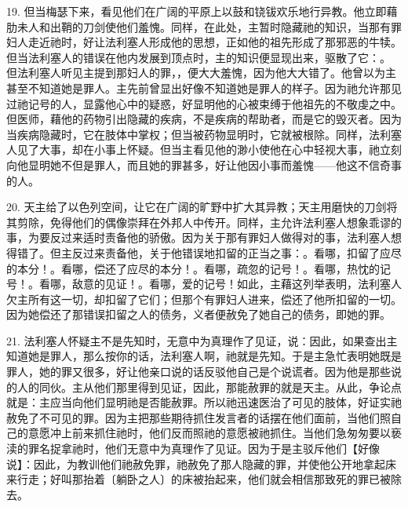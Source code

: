 19. 但当梅瑟下来，看见他们在广阔的平原上以鼓和铙钹欢乐地行异教。他立即藉肋未人和出鞘的刀剑使他们羞愧。同样，在此处，主暂时隐藏祂的知识，当那有罪妇人走近祂时，好让法利塞人形成他的思想，正如他的祖先形成了那邪恶的牛犊。但当法利塞人的错误在他内发展到顶点时，主的知识便显现出来，驱散了它：。 但法利塞人听见主提到那妇人的罪，，便大大羞愧，因为他大大错了。他曾以为主甚至不知道她是罪人。主先前曾显出好像不知道她是罪人的样子。因为祂允许那见过祂记号的人，显露他心中的疑惑，好显明他的心被束缚于他祖先的不敬虔之中。但医师，藉他的药物引出隐藏的疾病，不是疾病的帮助者，而是它的毁灭者。因为当疾病隐藏时，它在肢体中掌权；但当被药物显明时，它就被根除。同样，法利塞人见了大事，却在小事上怀疑。但当主看见他的渺小使他在心中轻视大事，祂立刻向他显明她不但是罪人，而且她的罪甚多，好让他因小事而羞愧——他这不信奇事的人。\par

20. 天主给了以色列空间，让它在广阔的旷野中扩大其异教；天主用磨快的刀剑将其剪除，免得他们的偶像崇拜在外邦人中传开。同样，主允许法利塞人想象乖谬的事，为要反过来适时责备他的骄傲。因为关于那有罪妇人做得对的事，法利塞人想得错了。但主反过来责备他，关于他错误地扣留的正当之事：。看哪，扣留了应尽的本分！。看哪，偿还了应尽的本分！。看哪，疏忽的记号！。看哪，热忱的记号！。看哪，敌意的见证！。看哪，爱的记号！如此，主藉这列举表明，法利塞人欠主所有这一切，却扣留了它们；但那个有罪妇人进来，偿还了他所扣留的一切。因为她偿还了那错误扣留之人的债务，义者便赦免了她自己的债务，即她的罪。\par

21. 法利塞人怀疑主不是先知时，无意中为真理作了见证，说：因此，如果查出主知道她是罪人，那么按你的话，法利塞人啊，祂就是先知。于是主急忙表明她既是罪人，她的罪又很多，好让他亲口说的话反驳他自己是个说谎者。因为他是那些说的人的同伙。主从他们那里得到见证，因此，那能赦罪的就是天主。从此，争论点就是：主应当向他们显明祂是否能赦罪。所以祂迅速医治了可见的肢体，好证实祂赦免了不可见的罪。因为主把那些期待抓住发言者的话摆在他们面前，当他们照自己的意愿冲上前来抓住祂时，他们反而照祂的意愿被祂抓住。当他们急匆匆要以亵渎的罪名捉拿祂时，他们无意中为真理作了见证。因为于是主驳斥他们【好像说】：因此，为教训他们祂赦免罪，祂赦免了那人隐藏的罪，并使他公开地拿起床来行走；好叫那抬着〔躺卧之人〕的床被抬起来，他们就会相信那致死的罪已被除去。\par

